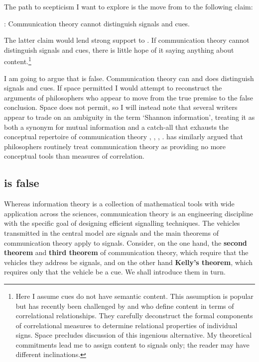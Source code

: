 \documentclass[12pt]{article}
\begin{document}
\noindent The path to scepticism I want to explore is the move from \ami{} to the following claim:

\begin{myquote}
\act: Communication theory cannot distinguish signals and cues.
\end{myquote}

\noindent The latter claim would lend strong support to \tic{}.
If communication theory cannot distinguish signals and cues, there is little hope of it saying anything about content.\footnote{Here I assume cues do not have semantic content. This assumption is popular but has recently been challenged by \citet{isaac2018semantics} and \citet[$\S$3]{skyrms2010signals} who define content in terms of correlational relationships. They carefully deconstruct the formal components of correlational measures to determine relational properties of individual signs. Space precludes discussion of this ingenious alternative. My theoretical commitments lead me to assign content to signals only; the reader may have different inclinations.}

I am going to argue that \act{} is false.
Communication theory can and does distinguish signals and cues.
If space permitted I would attempt to reconstruct the arguments of philosophers who appear to move from the true premise to the false conclusion.
Space does not permit, so I will instead note that several writers appear to trade on an ambiguity in the term `Shannon information', treating it as both a synonym for mutual information and a catch-all that exhausts the conceptual repertoire of communication theory \citep[p. 1 and $\S$2]{godfrey-smith2016biological}, \citep[759]{owren2010redefining}, \citep[106]{dennett2017bacteria}, \citep[p. 12, n. 11 and p. 78, n. 5]{shea2018representation}.
\citet[1216]{martinez2019representations} has similarly argued that philosophers routinely treat communication theory as providing no more conceptual tools than measures of correlation.

\subsection{\act{} is false}\label{subsec:actFalse}

Whereas information theory is a collection of mathematical tools with wide application across the sciences, communication theory is an engineering discipline with the specific goal of designing efficient signalling techniques.
The vehicles transmitted in the central model are signals and the main theorems of communication theory apply to signals.
Consider, on the one hand, the \textbf{second theorem} and \textbf{third theorem} of communication theory, which require that the vehicles they address be signals, and on the other hand \textbf{Kelly's theorem}, which requires only that the vehicle be a cue.
We shall introduce them in turn.
\end{document}
